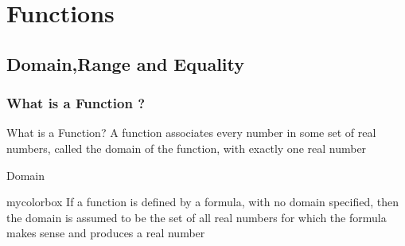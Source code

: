 \section{Functions} 

\subsection{Domain,Range and Equality}

\begin{frame}
  \frametitle{What is a Function ?}
  \begin{block}{What is a Function?}
    A function associates every number in some set of real numbers, called the domain of the function, with exactly one real number
  \end{block}
\end{frame}



\begin{frame}{Domain}
  \begin{beamercolorbox}[wd=\textwidth,rounded=true,shadow=true]{mycolorbox}
    If a function is defined by a formula, with no domain specified, then the domain is assumed to be the set of all real numbers for which the formula makes sense and produces a real number
  \end{beamercolorbox}
\end{frame}

